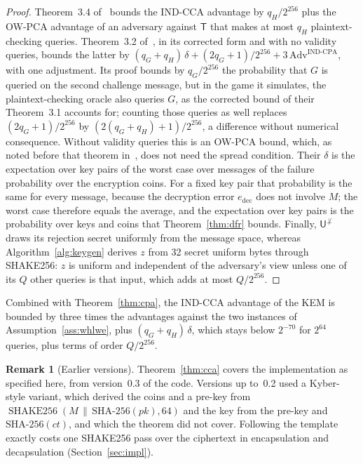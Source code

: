 \documentclass[11pt,a4paper]{article}
\theoremstyle{definition}
\newtheorem{remark}{Remark}
\newcommand{\SHAKE}{\operatorname{SHAKE256}}
\begin{document}
\begin{proof}
Theorem~3.4 of~\cite{hhk2017modular} bounds the IND-CCA advantage by $q_H/2^{256}$ plus the OW-PCA advantage of an adversary against $\mathsf{T}$ that makes at most $q_H$ plaintext-checking queries. Theorem~3.2 of~\cite{hhk2017modular}, in its corrected form and with no validity queries, bounds the latter by $(q_G + q_H)\,\delta + (2q_G + 1)/2^{256} + 3\,\mathrm{Adv}^{\mathrm{IND\text{-}CPA}}$, with one adjustment. Its proof bounds by $q_G/2^{256}$ the probability that $G$ is queried on the second challenge message, but in the game it simulates, the plaintext-checking oracle also queries $G$, as the corrected bound of their Theorem~3.1 accounts for; counting those queries as well replaces $(2q_G + 1)/2^{256}$ by $(2(q_G + q_H) + 1)/2^{256}$, a difference without numerical consequence. Without validity queries this is an OW-PCA bound, which, as noted before that theorem in~\cite{hhk2017modular}, does not need the spread condition. Their $\delta$ is the expectation over key pairs of the worst case over messages of the failure probability over the encryption coins. For a fixed key pair that probability is the same for every message, because the decryption error $e_{\mathrm{dec}}$ does not involve $M$; the worst case therefore equals the average, and the expectation over key pairs is the probability over keys and coins that Theorem~\ref{thm:dfr} bounds. Finally, $\mathsf{U}^{\not\perp}$ draws its rejection secret uniformly from the message space, whereas Algorithm~\ref{alg:keygen} derives $z$ from 32 secret uniform bytes through SHAKE256: $z$ is uniform and independent of the adversary's view unless one of its $Q$ other queries is that input, which adds at most $Q/2^{256}$.
\end{proof}

Combined with Theorem~\ref{thm:cpa}, the IND-CCA advantage of the KEM is bounded by three times the advantages against the two instances of Assumption~\ref{ass:whlwe}, plus $(q_G + q_H)\,\delta$, which stays below $2^{-70}$ for $2^{64}$ queries, plus terms of order $Q/2^{256}$.

\begin{remark}[Earlier versions]\label{rem:variant}
Theorem~\ref{thm:cca} covers the implementation as specified here, from version~0.3 of the code. Versions up to~0.2 used a Kyber-style variant, which derived the coins and a pre-key from $\SHAKE(M \,\|\, \mathrm{SHA\text{-}256}(\mathit{pk}), 64)$ and the key from the pre-key and $\mathrm{SHA\text{-}256}(\mathit{ct})$, and which the theorem did not cover. Following the template exactly costs one SHAKE256 pass over the ciphertext in encapsulation and decapsulation (Section~\ref{sec:impl}).
\end{remark}
\end{document}
